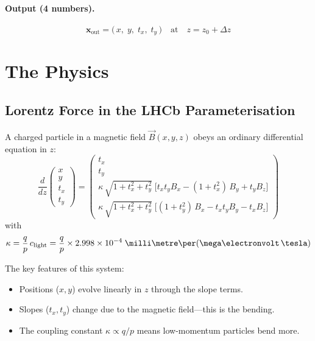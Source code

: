 \documentclass[11pt,a4paper]{article}
\newcommand{\si}[1]{\text{#1}}
\newcommand{\dz}{\Delta z}
\newcommand{\vB}{\vec{B}}
\newcommand{\tx}{t_x}
\newcommand{\ty}{t_y}
\begin{document}
\paragraph{Output (4 numbers).}
\begin{equation}\label{eq:output}
  \mathbf{x}_{\mathrm{out}} = \bigl(\, x,\; y,\; \tx,\; \ty \,\bigr)
  \quad\text{at}\quad z = z_0 + \dz
\end{equation}

\section{The Physics}\label{sec:physics}

\subsection{Lorentz Force in the LHCb Parameterisation}

A charged particle in a magnetic field $\vB(x,y,z)$ obeys an ordinary
differential equation in $z$:
\begin{equation}\label{eq:lorentz}
  \frac{d}{dz}
  \begin{pmatrix} x \\ y \\ \tx \\ \ty \end{pmatrix}
  =
  \begin{pmatrix}
    \tx \\[4pt]
    \ty \\[4pt]
    \kappa\,\sqrt{1+\tx^2+\ty^2}\;\bigl[\tx\ty B_x
      - (1+\tx^2)\,B_y + \ty B_z\bigr] \\[4pt]
    \kappa\,\sqrt{1+\tx^2+\ty^2}\;\bigl[(1+\ty^2)\,B_x
      - \tx\ty B_y - \tx B_z\bigr]
  \end{pmatrix}
\end{equation}
with
\begin{equation}\label{eq:kappa}
  \kappa = \frac{q}{p}\,c_{\mathrm{light}}
  = \frac{q}{p}\times 2.998\times10^{-4}
  \;\si{\milli\metre\per(\mega\electronvolt\,\tesla)}
\end{equation}

The key features of this system:
\begin{itemize}[nosep]
  \item Positions ($x,y$) evolve linearly in $z$ through the slope terms.
  \item Slopes ($\tx,\ty$) change due to the magnetic field---this is the
        bending.
  \item The coupling constant $\kappa\propto q/p$ means low-momentum
        particles bend more.
\end{itemize}
\end{document}
